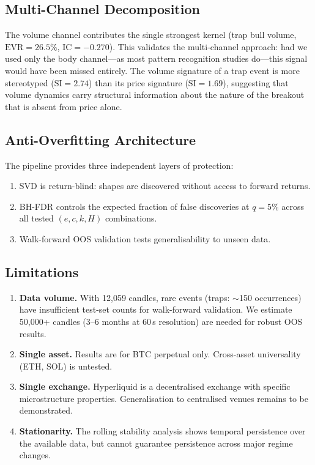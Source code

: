 \documentclass[11pt,a4paper]{article}
\theoremstyle{definition}
\theoremstyle{plain}
\begin{document}
\subsection{Multi-Channel Decomposition}

The volume channel contributes the single strongest kernel (trap bull
volume, $\mathrm{EVR} = 26.5\%$, $\mathrm{IC} = -0.270$). This validates
the multi-channel approach: had we used only the body channel---as most
pattern recognition studies do---this signal would have been missed entirely.
The volume signature of a trap event is more stereotyped ($\mathrm{SI} =
2.74$) than its price signature ($\mathrm{SI} = 1.69$), suggesting that
volume dynamics carry structural information about the nature of the
breakout that is absent from price alone.

\subsection{Anti-Overfitting Architecture}

The pipeline provides three independent layers of protection:
\begin{enumerate}
\item SVD is return-blind: shapes are discovered without access to forward
      returns.
\item BH-FDR controls the expected fraction of false discoveries at
      $q = 5\%$ across all tested $(e,c,k,H)$ combinations.
\item Walk-forward OOS validation tests generalisability to unseen data.
\end{enumerate}

\subsection{Limitations}

\begin{enumerate}
\item \textbf{Data volume.} With 12{,}059 candles, rare events
      (traps: $\sim$150 occurrences) have insufficient test-set counts for
      walk-forward validation. We estimate 50{,}000+ candles
      (3--6 months at 60\,s resolution) are needed for robust OOS results.
\item \textbf{Single asset.} Results are for BTC perpetual only.
      Cross-asset universality (ETH, SOL) is untested.
\item \textbf{Single exchange.} Hyperliquid is a decentralised exchange
      with specific microstructure properties. Generalisation to centralised
      venues remains to be demonstrated.
\item \textbf{Stationarity.} The rolling stability analysis shows temporal
      persistence over the available data, but cannot guarantee persistence
      across major regime changes.
\end{enumerate}
\end{document}
